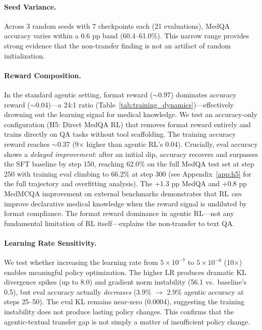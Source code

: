 \documentclass{article}
\begin{document}
\paragraph{Seed Variance.}
Across 3 random seeds with 7 checkpoints each (21 evaluations), MedQA accuracy varies within a 0.6 pp band (60.4--61.0\%). This narrow range provides strong evidence that the non-transfer finding is not an artifact of random initialization.

\paragraph{Reward Composition.}
In the standard agentic setting, format reward ($\sim$0.97) dominates accuracy reward ($\sim$0.04)---a 24:1 ratio (Table~\ref{tab:training_dynamics})---effectively drowning out the learning signal for medical knowledge. We test an accuracy-only configuration (H5: Direct MedQA RL) that removes format reward entirely and trains directly on QA tasks without tool scaffolding. The training accuracy reward reaches $\sim$0.37 (9$\times$ higher than agentic RL's 0.04). Crucially, eval accuracy shows a \emph{delayed improvement}: after an initial dip, accuracy recovers and surpasses the SFT baseline by step 150, reaching 62.0\% on the full MedQA test set at step 250 with training eval climbing to 66.2\% at step 300 (see Appendix~\ref{app:h5} for the full trajectory and overfitting analysis). The +1.3 pp MedQA and +0.8 pp MedMCQA improvement on external benchmarks demonstrates that RL \emph{can} improve declarative medical knowledge when the reward signal is undiluted by format compliance. The format reward dominance in agentic RL---not any fundamental limitation of RL itself---explains the non-transfer to text QA.

\paragraph{Learning Rate Sensitivity.}
We test whether increasing the learning rate from $5 \times 10^{-7}$ to $5 \times 10^{-6}$ (10$\times$) enables meaningful policy optimization. The higher LR produces dramatic KL divergence spikes (up to 8.0) and gradient norm instability (56.1 vs.\ baseline's 0.5), but eval accuracy actually \emph{decreases} (3.9\% $\to$ 2.9\% agentic accuracy at steps 25--50). The eval KL remains near-zero (0.0004), suggesting the training instability does not produce lasting policy changes. This confirms that the agentic-textual transfer gap is not simply a matter of insufficient policy change.
\end{document}
